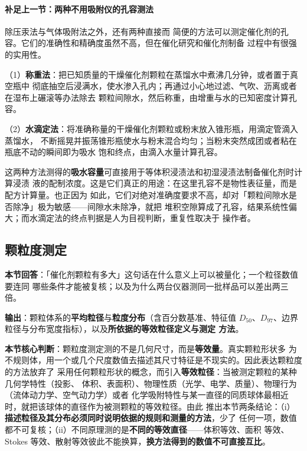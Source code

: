 
\paragraph{补足上一节：两种不用吸附仪的孔容测法}除压汞法与气体吸附法之外，还有两种直接而
简便的方法可以测定催化剂的孔容。它们的准确性和精确度虽然不高，但在催化研究和催化剂制备
过程中有很强的实用性。

（1）\textbf{称重法}：把已知质量的干燥催化剂颗粒在蒸馏水中煮沸几分钟，或者置于真空瓶中
彻底抽空后浸满水，使水渗入孔内；再通过小心地过滤、气吹、沥离或者在湿布上碾滚等办法除去
颗粒间隙水，然后称重，由增重与水的已知密度计算孔容。

（2）\textbf{水滴定法}：将准确称量的干燥催化剂颗粒或粉末放入锥形瓶，用滴定管滴入蒸馏水，
不断摇晃并振荡锥形瓶使水与粉末混合均匀；当粉末突然成团或者粘在瓶底不动的瞬间即为吸水
饱和终点，由滴入水量计算孔容。

这两种方法测得的\textbf{吸水容量}可直接用于等体积浸渍法和初湿浸渍法制备催化剂时计算浸渍
液的配制浓度。这是它们真正的用途：在这里孔容不是物性表征量，而是配方计算量。也正因为
如此，它们对绝对准确度要求不高，却对「颗粒间隙水是否除净」极为敏感——间隙水未除净，就把
堆积空隙算成了孔容，结果系统性偏大；而水滴定法的终点判据是人为目视判断，重复性取决于
操作者。

\subsection{颗粒度测定}

\begin{probout}
\textbf{本节回答}：「催化剂颗粒有多大」这句话在什么意义上可以被量化；一个粒径数值要连同
哪些条件才能被复核；以及为什么两台仪器测同一批样品可以差出两三倍。

\textbf{输出}：颗粒体系的\textbf{平均粒径}与\textbf{粒度分布}（含百分数基准、特征值
$D_{50}$、$D_{97}$、边界粒径与分布宽度指标），以及\textbf{所依据的等效粒径定义与测定
方法}。

\textbf{本节核心判断}：颗粒度测定测的不是几何尺寸，而是\textbf{等效量}。真实颗粒形状多
为不规则体，用一个或几个尺度数值去描述其尺寸特征是不现实的。因此表达颗粒度的方法放弃了
采用任何颗粒形状的概念，而引入\textbf{等效粒径}：当被测定颗粒的某种几何学特性（投影、
体积、表面积）、物理性质（光学、电学、质量）、物理行为（流体动力学、空气动力学）或者
化学吸附特性与某一直径的同质球体最相近时，就把该球体的直径作为被测颗粒的等效粒径。由此
推出本节两条结论：（i）\textbf{描述粒径及其分布必须同时说明依据的规则和测量的方法}，少了
任何一项，数值都不可复核；（ii）不同原理测的是\textbf{不同的等效直径}——体积等效、面积
等效、Stokes 等效、散射等效彼此不能换算，\textbf{换方法得到的数值不可直接互比}。
\end{probout}

